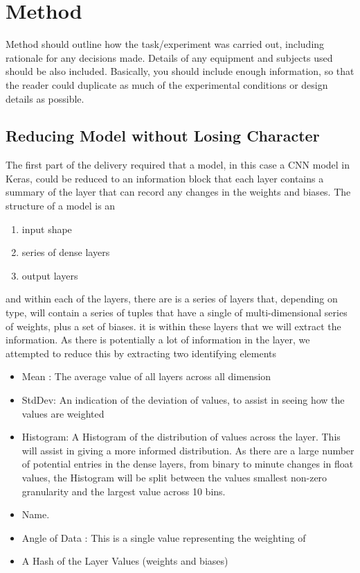 \section{Method}
Method should outline how the task/experiment was carried out, including rationale for any decisions made. Details of any equipment and subjects used should be also included. Basically, you should include enough information, so that the reader could duplicate as much of the experimental conditions or design details as possible.

\subsection{Reducing Model without Losing Character}
The first part of the delivery required that a model, in this case a CNN model in Keras, could be reduced to an information block that each layer contains a summary of the layer that can record any changes in the weights and biases. The structure of a model is an 
\begin{enumerate}
\item input shape
\item series of dense layers
\item output layers
\end{enumerate}

and within each of the layers, there are is a series of layers that, depending on type, will contain a series of tuples that have a single of multi-dimensional series of weights, plus a set of biases. it is within these layers that we will extract the information. As there is potentially a lot of information in the layer, we attempted to reduce this by extracting two identifying elements


\begin{itemize}
    \item Mean : The average value of all layers across all dimension
    \item StdDev: An indication of the deviation of values, to assist in seeing how the values are weighted
    \item Histogram: A Histogram of the distribution of values across the layer. This will assist in giving a more informed distribution. As there are a large number of potential entries in the dense layers, from binary to minute changes in float values, the Histogram will be split between the values smallest non-zero granularity and the largest value across 10 bins.
    \item Name.
    \item Angle of Data : This is a single value representing the weighting of 
    \item A Hash of the Layer Values (weights and biases)
\end{itemize}

